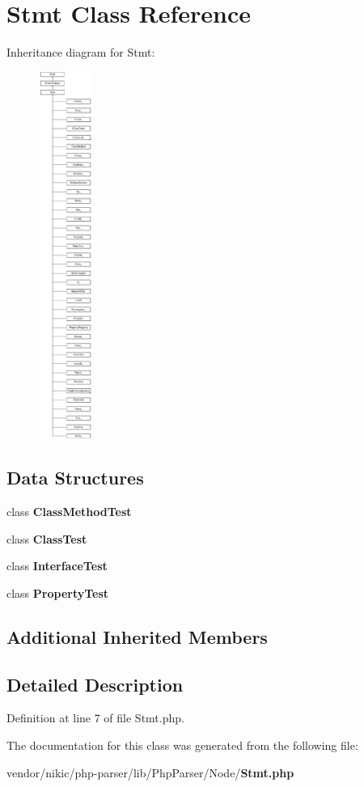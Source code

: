 \section{Stmt Class Reference}
\label{class_php_parser_1_1_node_1_1_stmt}
Inheritance diagram for Stmt\+:\begin{figure}[H]
\begin{center}
\leavevmode
\includegraphics[height=12.000000cm]{class_php_parser_1_1_node_1_1_stmt}
\end{center}
\end{figure}
\subsection*{Data Structures}
\begin{DoxyCompactItemize}
\item 
class {\bf Class\+Method\+Test}
\item 
class {\bf Class\+Test}
\item 
class {\bf Interface\+Test}
\item 
class {\bf Property\+Test}
\end{DoxyCompactItemize}
\subsection*{Additional Inherited Members}


\subsection{Detailed Description}


Definition at line 7 of file Stmt.\+php.



The documentation for this class was generated from the following file\+:\begin{DoxyCompactItemize}
\item 
vendor/nikic/php-\/parser/lib/\+Php\+Parser/\+Node/{\bf Stmt.\+php}\end{DoxyCompactItemize}
